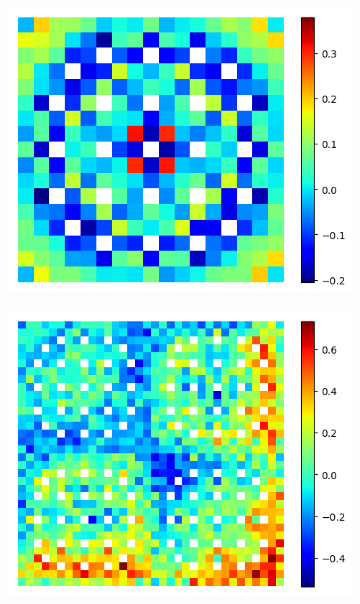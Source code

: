 \begin{figure}[h!]
\begin{subfigure}{0.45\textwidth}
  \includegraphics[width=\linewidth]{figures/assembly/fiss-degenerate-errors}
  \caption{}
  \label{fig:assm-fiss-degen-error}
\end{subfigure}
\begin{subfigure}{0.45\textwidth}
  \centering
  \includegraphics[width=\linewidth]{figures/reflector/fiss-null-errors}
  \caption{}
  \label{fig:reflector-fiss-null-error}
\end{subfigure}%
\begin{subfigure}{0.45\textwidth}
  \centering

\end{subfigure}
\end{figure}
